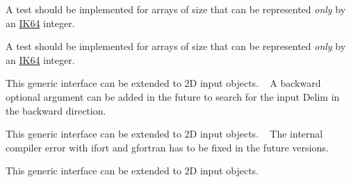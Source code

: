 \begin{DoxyRefList}
\item[Type \mbox{\hyperlink{interfaceArraySort__mod_1_1sort}{Array\+Sort\+\_\+mod\+::sort}} ]\label{todo__todo000021}%
%
 A test should be implemented for arrays of size that can be represented {\itshape only} by an \mbox{\hyperlink{namespaceConstants__mod_ad6aaf2f477491dc84e7ebbab3b64694e}{IK64}} integer. 
\item[Type \mbox{\hyperlink{interfaceArraySort__mod_1_1sortIndex}{Array\+Sort\+\_\+mod\+::sort\+Index}} ]\label{todo__todo000022}%
%
 A test should be implemented for arrays of size that can be represented {\itshape only} by an \mbox{\hyperlink{namespaceConstants__mod_ad6aaf2f477491dc84e7ebbab3b64694e}{IK64}} integer. 
\item[Type \mbox{\hyperlink{interfaceArraySplit__mod_1_1split}{Array\+Split\+\_\+mod\+::split}} ]\label{todo__todo000023}%
%
 This generic interface can be extended to 2D input objects. ~\newline
 A {\ttfamily backward} optional argument can be added in the future to search for the input {\ttfamily Delim} in the backward direction. ~\newline
 
\item[Type \mbox{\hyperlink{interfaceArrayUnique__mod_1_1genUnique}{Array\+Unique\+\_\+mod\+::gen\+Unique}} ]\label{todo__todo000024}%
%
 This generic interface can be extended to 2D input objects. ~\newline
 The internal compiler error with {\ttfamily ifort} and {\ttfamily gfortran} has to be fixed in the future versions. ~\newline
 
\item[Type \mbox{\hyperlink{interfaceArrayUnique__mod_1_1getUnique}{Array\+Unique\+\_\+mod\+::get\+Unique}} ]\label{todo__todo000025}%
%
 This generic interface can be extended to 2D input objects. ~\newline



\end{DoxyRefList}
